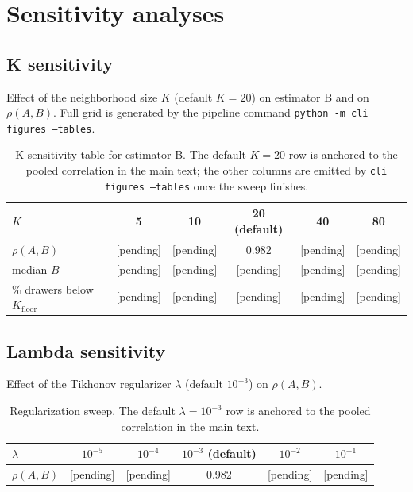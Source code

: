\appendix
\section{Sensitivity analyses}

\subsection{K sensitivity}
Effect of the neighborhood size $K$ (default $K = 20$) on estimator B
and on $\rho(A, B)$. Full grid is generated by the pipeline command
\texttt{python -m cli figures --tables}.

\begin{table}[h]
\centering
\begin{tabular}{lccccc}
\toprule
$K$ & 5 & 10 & 20 (default) & 40 & 80 \\
\midrule
$\rho(A, B)$              & [pending] & [pending] & 0.982     & [pending] & [pending] \\
median $B$                & [pending] & [pending] & [pending] & [pending] & [pending] \\
\% drawers below $K_{\mathrm{floor}}$ & [pending] & [pending] & [pending] & [pending] & [pending] \\
\bottomrule
\end{tabular}
\caption{K-sensitivity table for estimator B. The default $K = 20$ row
is anchored to the pooled correlation in the main text; the other
columns are emitted by \texttt{cli figures --tables} once the sweep
finishes.}
\end{table}

\subsection{Lambda sensitivity}
Effect of the Tikhonov regularizer $\lambda$ (default $10^{-3}$) on
$\rho(A, B)$.

\begin{table}[h]
\centering
\begin{tabular}{lccccc}
\toprule
$\lambda$ & $10^{-5}$ & $10^{-4}$ & $10^{-3}$ (default) & $10^{-2}$ & $10^{-1}$ \\
\midrule
$\rho(A, B)$ & [pending] & [pending] & 0.982 & [pending] & [pending] \\
\bottomrule
\end{tabular}
\caption{Regularization sweep. The default $\lambda = 10^{-3}$ row is
anchored to the pooled correlation in the main text.}
\end{table}

